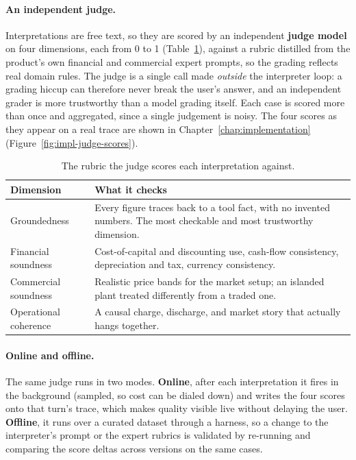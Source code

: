 \paragraph{An independent judge.} Interpretations are free text, so they are scored
by an independent \textbf{judge model} on four dimensions, each from 0 to 1
(Table~\ref{tab:judge}), against a rubric distilled from the product's own
financial and commercial expert prompts, so the grading reflects real domain rules.
The judge is a single call made \emph{outside} the interpreter loop: a grading
hiccup can therefore never break the user's answer, and an independent grader is
more trustworthy than a model grading itself. Each case is scored more than once and
aggregated, since a single judgement is noisy. The four scores as they appear on a
real trace are shown in Chapter~\ref{chap:implementation}
(Figure~\ref{fig:impl-judge-scores}).

\begin{table}[H]
  \centering
  \small
  \begin{tabularx}{\linewidth}{@{}>{\raggedright\arraybackslash}p{3.7cm} >{\raggedright\arraybackslash}X@{}}
    \toprule
    \textbf{Dimension} & \textbf{What it checks} \\
    \midrule
    Groundedness & Every figure traces back to a tool fact, with no invented
      numbers. The most checkable and most trustworthy dimension. \\
    Financial soundness & Cost-of-capital and discounting use, cash-flow
      consistency, depreciation and tax, currency consistency. \\
    Commercial soundness & Realistic price bands for the market setup; an islanded
      plant treated differently from a traded one. \\
    Operational coherence & A causal charge, discharge, and market story that
      actually hangs together. \\
    \bottomrule
  \end{tabularx}
  \caption{The rubric the judge scores each interpretation against.}
  \label{tab:judge}
\end{table}

\paragraph{Online and offline.} The same judge runs in two modes. \textbf{Online},
after each interpretation it fires in the background (sampled, so cost can be dialed
down) and writes the four scores onto that turn's trace, which makes quality visible
live without delaying the user. \textbf{Offline}, it runs over a curated dataset
through a harness, so a change to the interpreter's prompt or the expert rubrics is
validated by re-running and comparing the score deltas across versions on the same
cases.



